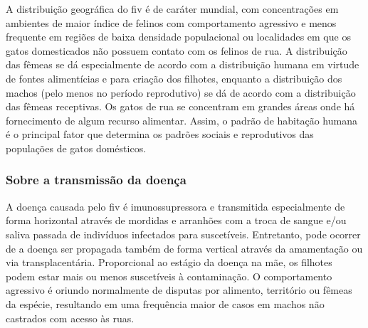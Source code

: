 \documentclass{article}
\begin{document}
\noindent A distribuição geográfica do \gls{fiv} é de caráter mundial, com concentrações em ambientes de maior índice de felinos com comportamento agressivo e menos frequente em regiões de baixa densidade populacional ou localidades em que os gatos domesticados não possuem contato com os felinos de rua. A distribuição das fêmeas se dá especialmente de acordo com a distribuição humana em virtude de fontes alimentícias e para criação dos filhotes, enquanto a distribuição dos machos (pelo menos no período reprodutivo) se dá de acordo com a distribuição das fêmeas receptivas. Os gatos de rua se concentram em grandes áreas onde há fornecimento de algum recurso alimentar. Assim, o padrão de habitação humana é o
principal fator que determina os padrões sociais e
reprodutivos das populações de gatos domésticos.\cite{base}\\

\subsubsection{Sobre a transmissão da doença}
\noindent A doença causada pelo \gls{fiv} é imunossupressora e transmitida especialmente de forma horizontal através de mordidas e arranhões com a troca de sangue e/ou saliva passada de indivíduos infectados para suscetíveis. Entretanto, pode ocorrer de a doença ser propagada também de forma vertical através da amamentação ou via transplacentária. Proporcional ao estágio da doença na mãe, os filhotes podem estar mais ou menos suscetíveis à contaminação. O comportamento agressivo é oriundo normalmente de disputas por alimento, território ou fêmeas da espécie, resultando em uma frequência maior de casos em machos não castrados com acesso às ruas.\\
\end{document}
